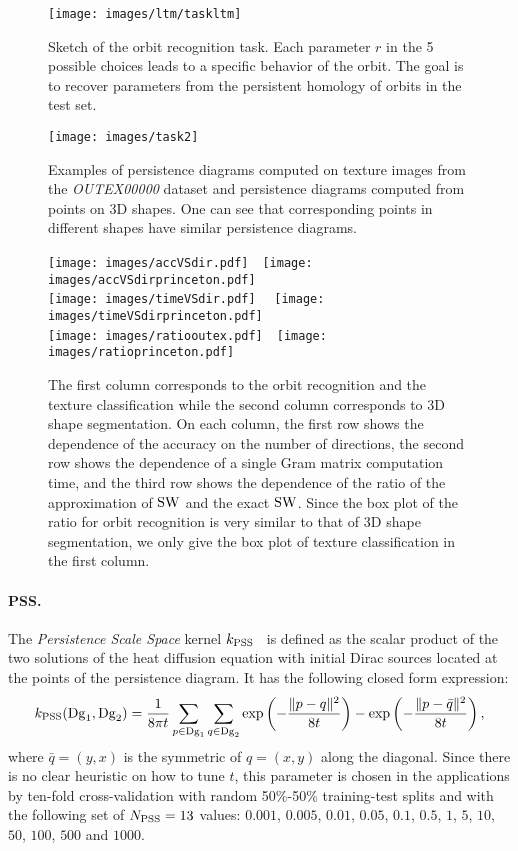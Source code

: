 \documentclass[11pt]{article}
\newcommand{\Dg}{\mathrm{Dg}}
\newcommand{\kPSS}{k_{\rm PSS}}
\newcommand{\SW}{{\rm SW}}
\begin{document}
\begin{figure*}[t] 
\centering
\texttt{[image: images/ltm/taskltm]}
\caption{\label{fig:taskltm} Sketch of the orbit recognition task. Each parameter $r$ in the 5 possible choices
leads to a specific behavior of the orbit. 
The goal is to recover parameters from the persistent homology of orbits in the test set.}
\end{figure*}

\begin{figure*}[t] 
\centering
\texttt{[image: images/task2]}
\caption{\label{fig:task2} Examples of persistence diagrams computed on texture images from the \emph{OUTEX00000} dataset
and persistence diagrams computed from points on 3D shapes. One can see that corresponding points in different shapes have
similar persistence diagrams.}
\end{figure*}

\begin{figure}\centering
\texttt{[image: images/accVSdir.pdf]}\ \ \texttt{[image: images/accVSdirprinceton.pdf]} \\
\texttt{[image: images/timeVSdir.pdf]} \ \ \texttt{[image: images/timeVSdirprinceton.pdf]} \\
\texttt{[image: images/ratiooutex.pdf]}\ \ \texttt{[image: images/ratioprinceton.pdf]}
\caption{\label{fig:plots} The first column corresponds to the orbit recognition and the texture classification while the second
column corresponds to 3D shape segmentation. 
On each column, the first row shows the dependence of the accuracy on the number of directions,
the second row shows the dependence of a single Gram matrix computation time, and the third row
shows the dependence of the ratio of the approximation of $\SW$ and the exact $\SW$.
Since the box plot of the ratio for orbit recognition is very similar to that of 3D shape segmentation,
we only give the box plot of texture classification in the first column. }
\end{figure}


\paragraph*{PSS.} The {\em Persistence Scale Space} kernel $\kPSS$~\cite{Reininghaus15} is
defined as the scalar product of the two solutions of the heat diffusion equation
with initial Dirac sources located at the points of the persistence diagram. It has the following closed form expression:
$$\kPSS(\Dg_1,\Dg_2)=\frac{1}{8\pi t}\sum_{p\in \Dg_1}\sum_{q\in \Dg_2} {\rm exp}\left(-\frac{\|p-q\|^2}{8t}\right) 
- {\rm exp}\left(-\frac{\|p-\bar q\|^2}{8t}\right),$$
where $\bar q=(y,x)$ is the symmetric of $q=(x,y)$ along the diagonal.
Since there is no clear heuristic on how to tune $t$, this parameter is chosen in the applications 
by ten-fold cross-validation with random 50\%-50\%
training-test splits and with the following set of $N_{\rm PSS}=13$ values: $0.001$, $0.005$, $0.01$, $0.05$, 
$0.1$, $0.5$, $1$, $5$, $10$, $50$, $100$, $500$ and $1000$. 
\end{document}
